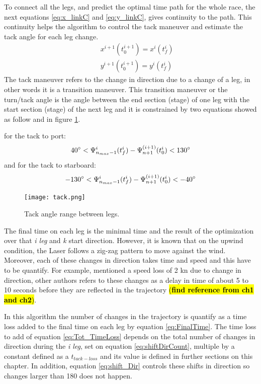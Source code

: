 To connect all the legs, and predict the optimal time path for the whole race, the next equations \ref{eq:x_linkC} and \ref{eq:y_linkC}, gives continuity to the path. This continuity helps the algorithm to control the tack maneuver and estimate the tack angle for each leg change.
\begin{align}
    \quad & x^{i+1}(t_{0}^{i+1})=x^{i}(t_{f}^{i})\label{eq:x_linkC}\\
    \quad & y^{i+1}(t_{0}^{i+1})=y^{i}(t_{f}^{i}) \label{eq:y_linkC}
\end{align}
The tack maneuver refers to the change in direction due to a change of a leg, in other words it is a transition maneuver. This transition maneuver or the turn/tack angle is the angle between the end section (stage) of one leg with the start  section (stage) of the next leg and it is constrained by two equations showed as follow and in figure \ref{fig:tackAngL}.\par
\noindent
for the tack to port:
\begin{equation}\label{eq:tackportC}
40\degree < \Psi_{n_{max}-1}^{i}(t_{f}^{i}) -
\Psi_{n+1}^{(i+1)}(t_{0}^{i}) < 130 \degree
\end{equation}
\noindent
and for the tack to starboard:
\begin{equation}\label{eq:tackstarbC}
-130\degree < \Psi_{n_{max}-1}^{i}(t_{f}^{i}) -
\Psi_{n+1}^{(i+1)}(t_{0}^{i}) < -40 \degree
\end{equation}
\begin{figure} [hbt!]
    \centering
    \texttt{[image: tack.png]}
    \caption{Tack angle range between legs.}
    \label{fig:tackAngL}
\end{figure}
The final time on each leg is the minimal time and the result of the optimization over that \textit{i leg} and \textit{k} start direction. However, it is known that on the upwind condition, the Laser follows a zig-zag pattern to move against the wind. Moreover, each of these changes in direction takes time and speed and this have to be quantify. For example, \cite{rein2012tra} mentioned a speed loss of 2 kn due to change in direction, other authors refers to these changes as a delay in time of about 5 to 10 seconds before they are reflected in the trajectory \hl{(\textbf{find reference from ch1 and ch2})}. \par \noindent
In this algorithm the number of changes in the trajectory is quantify as a time loss added to the final time on each leg by equation \ref{eq:FinalTime}. The time loss to add of equation \ref{eq:Tot_TimeLoss} depends on the total number of changes in direction during the \textit{i leg}, set on equation \ref{eq:shiftDirCount}, multiple by a constant defined as a $t_{tack-loss}$ and its value is defined in further sections on this chapter. In addition, equation \ref{eq:shift_Dir} controls these shifts in direction so changes larger than 180 \degree  does not happen.
